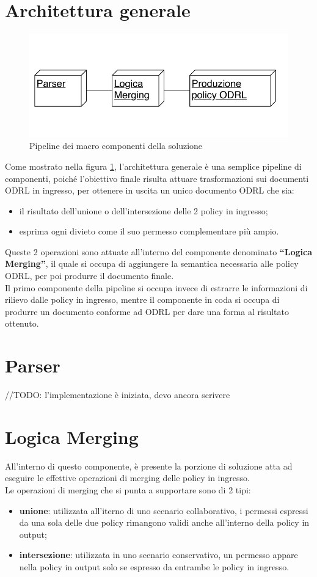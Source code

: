 \documentclass[12pt,a4paper,twoside]{book}
\begin{document}
\section{Architettura generale}
\begin{figure}[htp]
\centering
\includegraphics[scale=1]{../immagini/arch_gen.pdf}
\caption{Pipeline dei macro componenti della soluzione}
\label{archGenImpl}
\end{figure}
Come mostrato nella figura \ref{archGenImpl}, l'architettura generale è una semplice pipeline di componenti, poiché l'obiettivo finale risulta attuare trasformazioni sui documenti ODRL in ingresso, per ottenere in uscita un unico documento ODRL che sia:
\begin{itemize}
\item il risultato dell'unione o dell'intersezione delle 2 policy in ingresso;
\item esprima ogni divieto come il suo permesso complementare più ampio.
\end{itemize}
Queste 2 operazioni sono attuate all'interno del componente denominato \textbf{``Logica Merging''}, il quale si occupa di aggiungere la semantica necessaria alle policy ODRL, per poi produrre il documento finale.\\
Il primo componente della pipeline si occupa invece di estrarre le informazioni di rilievo dalle policy in ingresso, mentre il componente in coda si occupa di produrre un documento conforme ad ODRL per dare una forma al risultato ottenuto.
\section{Parser}
//TODO: l'implementazione è iniziata, devo ancora scrivere
\section{Logica Merging}
All'interno di questo componente, è presente la porzione di soluzione atta ad eseguire le effettive operazioni di merging delle policy in ingresso.\\
Le operazioni di merging che si punta a supportare sono di 2 tipi:
\begin{itemize}
\item \textbf{unione}: utilizzata all'iterno di uno scenario collaborativo, i permessi espressi da una sola delle due policy rimangono validi anche all'interno della policy in output;
\item \textbf{intersezione}: utilizzata in uno scenario conservativo, un permesso appare nella policy in output solo se espresso da entrambe le policy in ingresso.
\end{itemize}
\end{document}
